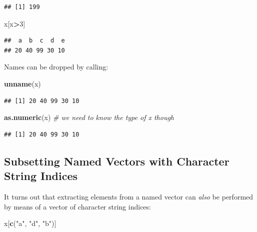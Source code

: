 \documentclass[10pt,b5paper,krantz1]{krantz}
\newenvironment{Shaded}{\begin{snugshade}}{\end{snugshade}}
\newcommand{\CommentTok}[1]{\textcolor[rgb]{0.37,0.37,0.37}{\textit{#1}}}
\newcommand{\DecValTok}[1]{\textcolor[rgb]{0.06,0.06,0.06}{#1}}
\newcommand{\KeywordTok}[1]{\textcolor[rgb]{0.27,0.27,0.27}{\textbf{#1}}}
\newcommand{\NormalTok}[1]{#1}
\newcommand{\OperatorTok}[1]{\textcolor[rgb]{0.43,0.43,0.43}{\textbf{#1}}}
\newcommand{\StringTok}[1]{\textcolor[rgb]{0.5,0.5,0.5}{#1}}
\begin{document}
\begin{verbatim}
## [1] 199
\end{verbatim}

\begin{Shaded}
\begin{Highlighting}[]
\NormalTok{x[x}\OperatorTok{>}\DecValTok{3}\NormalTok{]}
\end{Highlighting}
\end{Shaded}

\begin{verbatim}
##  a  b  c  d  e 
## 20 40 99 30 10
\end{verbatim}

Names can be dropped by calling:

\begin{Shaded}
\begin{Highlighting}[]
\KeywordTok{unname}\NormalTok{(x)}
\end{Highlighting}
\end{Shaded}

\begin{verbatim}
## [1] 20 40 99 30 10
\end{verbatim}

\begin{Shaded}
\begin{Highlighting}[]
\KeywordTok{as.numeric}\NormalTok{(x) }\CommentTok{# we need to know the type of x though}
\end{Highlighting}
\end{Shaded}

\begin{verbatim}
## [1] 20 40 99 30 10
\end{verbatim}

\hypertarget{subsetting-named-vectors-with-character-string-indices}{%
\subsection{Subsetting Named Vectors with Character String Indices}\label{subsetting-named-vectors-with-character-string-indices}}

It turns out that extracting elements from a named vector can \emph{also} be
performed by means of a vector of character string indices:

\begin{Shaded}
\begin{Highlighting}[]
\NormalTok{x[}\KeywordTok{c}\NormalTok{(}\StringTok{"a"}\NormalTok{, }\StringTok{"d"}\NormalTok{, }\StringTok{"b"}\NormalTok{)]}
\end{Highlighting}
\end{Shaded}
\end{document}
